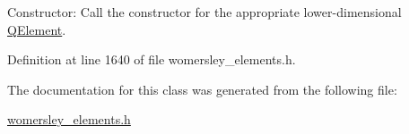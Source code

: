 Constructor\+: Call the constructor for the appropriate lower-\/dimensional \hyperlink{classoomph_1_1QElement}{Q\+Element}. 



Definition at line 1640 of file womersley\+\_\+elements.\+h.



The documentation for this class was generated from the following file\+:\begin{DoxyCompactItemize}
\item 
\hyperlink{womersley__elements_8h}{womersley\+\_\+elements.\+h}\end{DoxyCompactItemize}
